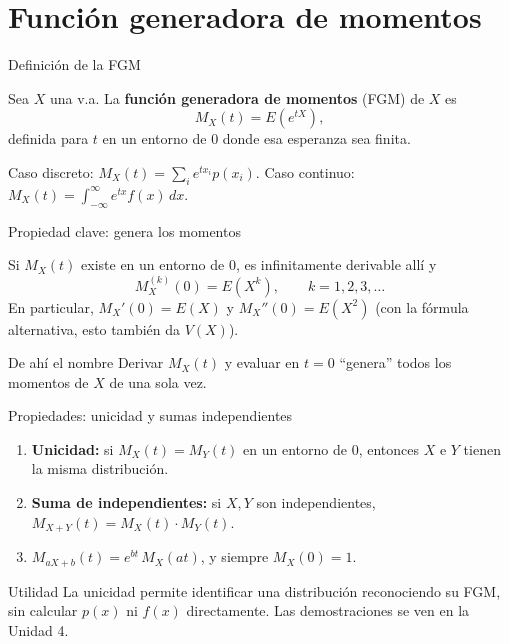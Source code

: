 \documentclass[aspectratio=169,11pt]{beamer}
\begin{document}
\section{Función generadora de momentos}

\begin{frame}{Definición de la FGM}
\begin{definition}
Sea $X$ una v.a. La \textbf{función generadora de momentos} (FGM) de $X$ es
\[
M_X(t) = E\left(e^{tX}\right),
\]
definida para $t$ en un entorno de $0$ donde esa esperanza sea finita.
\end{definition}

Caso discreto: $M_X(t)=\sum_i e^{tx_i}p(x_i)$. Caso continuo: $M_X(t) = \int_{-\infty}^{\infty} e^{tx}f(x)\,dx$.
\end{frame}

\begin{frame}{Propiedad clave: genera los momentos}
\begin{theorem}
Si $M_X(t)$ existe en un entorno de $0$, es infinitamente derivable allí y
\[
M_X^{(k)}(0) = E(X^k), \qquad k=1,2,3,\dots
\]
En particular, $M_X'(0) = E(X)$ y $M_X''(0) = E(X^2)$ (con la fórmula alternativa, esto también da $V(X)$).
\end{theorem}

\begin{alertblock}{De ahí el nombre}
Derivar $M_X(t)$ y evaluar en $t=0$ ``genera'' todos los momentos de $X$ de una sola vez.
\end{alertblock}
\end{frame}

\begin{frame}{Propiedades: unicidad y sumas independientes}
\begin{theorem}
\begin{enumerate}
\item \textbf{Unicidad:} si $M_X(t)=M_Y(t)$ en un entorno de $0$, entonces $X$ e $Y$ tienen la misma distribución.
\item \textbf{Suma de independientes:} si $X,Y$ son independientes, $M_{X+Y}(t) = M_X(t)\cdot M_Y(t)$.
\item $M_{aX+b}(t) = e^{bt}\,M_X(at)$, y siempre $M_X(0)=1$.
\end{enumerate}
\end{theorem}

\begin{alertblock}{Utilidad}
La unicidad permite identificar una distribución reconociendo su FGM, sin calcular $p(x)$ ni $f(x)$ directamente. Las demostraciones se ven en la Unidad 4.
\end{alertblock}
\end{frame}
\end{document}

